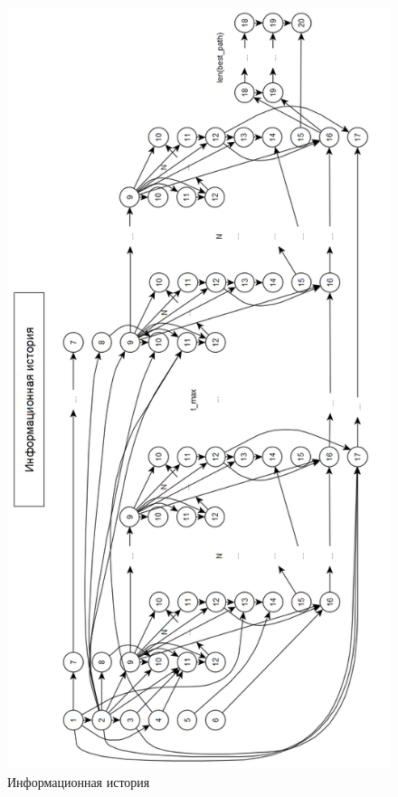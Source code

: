\documentclass[a4paper, 12pt]{extreport}
\begin{document}
\begin{figure}[h]
	\centering
	\includegraphics[scale=0.6]{tools/graph-inf-hist.png}
	\caption{Информационная история}
	\label{graph-inf-hist}
\end{figure}
\end{document}
